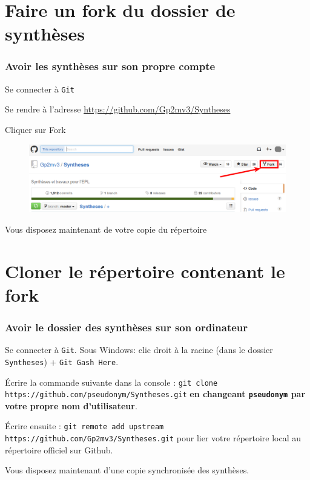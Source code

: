 \documentclass{beamer}
\newenvironment{wideitemize}{\itemize\addtolength{\itemsep}{10pt}}{\enditemize}
\begin{document}
\section{Faire un fork du dossier de synthèses}

\begin{frame}
	\frametitle{Avoir les synthèses sur son propre compte}
		\begin{wideitemize}
			\item Se connecter à \lstinline|Git|
			\pause
			\item Se rendre à l'adresse
                \url{https://github.com/Gp2mv3/Syntheses}
			\pause
			\item Cliquer sur Fork
                \begin{figure}[H]
                    \centering
                    \includegraphics[width=\linewidth]{fork.png}
                \end{figure}
			\pause
			\item Vous disposez maintenant de votre copie du répertoire
		\end{wideitemize}
\end{frame}

\section{Cloner le répertoire contenant le fork}

\begin{frame}[fragile]
    \frametitle{Avoir le dossier des synthèses sur son ordinateur}
    \begin{wideitemize}
        \item Se connecter à \lstinline|Git|. Sous Windows: clic droit à la racine (dans le dossier \lstinline|Syntheses|) + \lstinline|Git Gash Here|.
        \pause
        \item Écrire la commande suivante dans la console :
            \lstinline[mathescape]|git clone https://github.com/pseudonym/Syntheses.git| \textbf{en changeant \lstinline|pseudonym| par votre propre nom d'utilisateur}.
        \pause
        \item Écrire ensuite :
            \lstinline[mathescape]|git remote add upstream https://github.com/Gp2mv3/Syntheses.git| pour lier votre répertoire local au répertoire officiel sur Github.
        \pause
        \item Vous disposez maintenant d'une copie synchronisée des
            synthèses.
    \end{wideitemize}
\end{frame}
\end{document}

